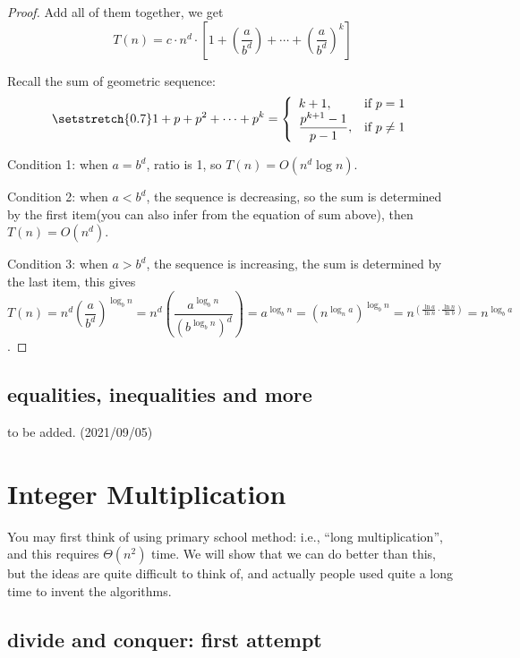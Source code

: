 \begin{spacing}{1.3}
\begin{proof}
    Add all of them together, we get 
    $$T(n)=c\cdot n^d\cdot \left[ 1+ \left(\dfrac{a}{b^d}\right)+\cdots + \left(\dfrac{a}{b^d}\right)^k\right]$$

    Recall the sum of geometric sequence:
    \begin{align*}
        \setstretch{0.7}
        1+p+p^2+\cdots +p^k=\left\{
        \begin{array}{ll}
            k+1, & \text{if } p=1\\
            \dfrac{p^{k+1}-1}{p-1}, & \text{if } p\ne 1
        \end{array}\right.
    \end{align*}

    Condition 1: when $a=b^d$, ratio is 1, so $T(n)=O(n^d\log n)$.

    Condition 2: when $a<b^d$, the sequence is decreasing, 
    so the sum is determined by the first item(you can also 
    infer from the equation of sum above), then $T(n)=O(n^d)$.

    Condition 3: when $a>b^d$, the sequence is increasing, 
    the sum is determined by the last item, this gives 
    $T(n)=n^{d}\left(\dfrac{a}{b^{d}}\right)^{\log _{b} n}=
    n^{d}\left(\dfrac{a^{\log _{b} n}}{\left(b^{\log _{b} n}\right)^{d}}\right)=
    a^{\log _{b} n}=
    \left(n^{\log_n{a}}\right)^{\log_b{n}}=
    n^{\left(\frac{\ln a}{\ln n}\cdot \frac{\ln n}{\ln b}\right)}=
    n^{\log _{b} a}$.
    \end{proof}

    \newpage
    \subsection{equalities, inequalities and more}

    {\Large\color{red} to be added. (2021/09/05)}

    \newpage
    \section{Integer Multiplication}

    You may first think of using primary school method: 
    i.e., ``long multiplication'', and this requires $\Theta(n^2)$
    time. We will show that we can do better than this, but 
    the ideas are quite difficult to think of, and actually 
    people used quite a long time to invent the algorithms.

    \subsection{divide and conquer: first attempt}


\end{spacing}
